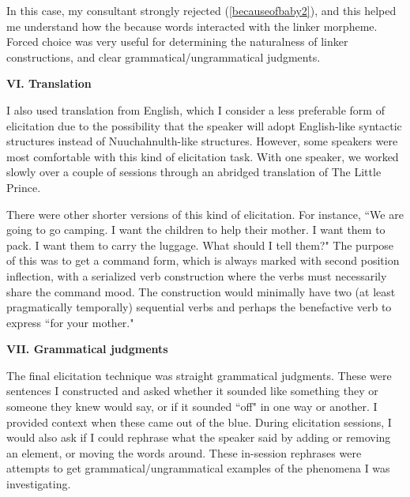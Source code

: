 In this case, my consultant strongly rejected (\ref{becauseofbaby2}), and this helped me understand how the because words interacted with the linker morpheme. Forced choice was very useful for determining the naturalness of linker constructions, and clear grammatical/ungrammatical judgments.

\vspace{8pt}

\noindent \textbf{VI. Translation}

I also used translation from English, which I consider a less preferable form of elicitation due to the possibility that the speaker will adopt English-like syntactic structures instead of Nuuchahnulth-like structures. However, some speakers were most comfortable with this kind of elicitation task. With one speaker, we worked slowly over a couple of sessions through an abridged translation of The Little Prince.

There were other shorter versions of this kind of elicitation. For instance, ``We are going to go camping. I want the children to help their mother. I want them to pack. I want them to carry the luggage. What should I tell them?" The purpose of this was to get a command form, which is always marked with second position inflection, with a serialized verb construction where the verbs must necessarily share the command mood. The construction would minimally have two (at least pragmatically temporally) sequential verbs and perhaps the benefactive verb to express ``for your mother."

\vspace{8pt}

\noindent \textbf{VII. Grammatical judgments}

The final elicitation technique was straight grammatical judgments. These were sentences I constructed and asked whether it sounded like something they or someone they knew would say, or if it sounded ``off" in one way or another. I provided context when these came out of the blue. During elicitation sessions, I would also ask if I could rephrase what the speaker said by adding or removing an element, or moving the words around. These in-session rephrases were attempts to get grammatical/ungrammatical examples of the phenomena I was investigating.


